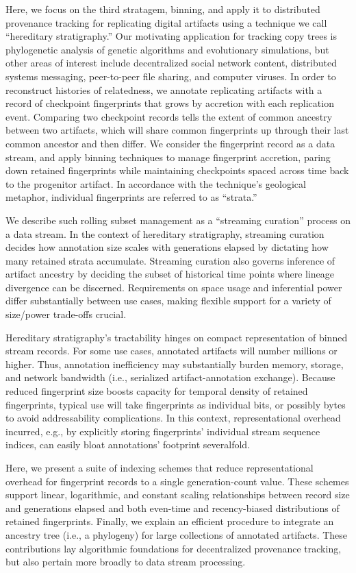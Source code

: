 Here, we focus on the third stratagem, binning, and apply it to distributed provenance tracking for replicating digital artifacts using a technique we call ``hereditary stratigraphy.''
Our motivating application for tracking copy trees is phylogenetic analysis of genetic algorithms and evolutionary simulations, but other areas of interest include decentralized social network content, distributed systems messaging, peer-to-peer file sharing, and computer viruses.
In order to reconstruct histories of relatedness, we annotate replicating artifacts with a record of checkpoint fingerprints that grows by accretion with each replication event.
Comparing two checkpoint records tells the extent of common ancestry between two artifacts, which will share common fingerprints up through their last common ancestor and then differ.
We consider the fingerprint record as a data stream, and apply binning techniques to manage fingerprint accretion, paring down retained fingerprints while maintaining checkpoints spaced across time back to the progenitor artifact.
In accordance with the technique's geological metaphor, individual fingerprints are referred to as ``strata.''

We describe such rolling subset management as a ``streaming curation'' process on a data stream.
In the context of hereditary stratigraphy, streaming curation decides how annotation size scales with generations elapsed by dictating how many retained strata accumulate.
Streaming curation also governs inference of artifact ancestry by deciding the subset of historical time points where lineage divergence can be discerned.
Requirements on space usage and inferential power differ substantially between use cases, making flexible support for a variety of size/power trade-offs crucial.

Hereditary stratigraphy's tractability hinges on compact representation of binned stream records.
For some use cases, annotated artifacts will number millions or higher.
Thus, annotation inefficiency may substantially burden memory, storage, and network bandwidth (i.e., serialized artifact-annotation exchange).
Because reduced fingerprint size boosts capacity for temporal density of retained fingerprints, typical use will take fingerprints as individual bits, or possibly bytes to avoid addressability complications.
In this context, representational overhead incurred, e.g., by explicitly storing fingerprints' individual stream sequence indices, can easily bloat annotations' footprint severalfold.

Here, we present a suite of indexing schemes that reduce representational overhead for fingerprint records to a single generation-count value.
These schemes support linear, logarithmic, and constant scaling relationships between record size and generations elapsed and both even-time and recency-biased distributions of retained fingerprints.
Finally, we explain an efficient procedure to integrate an ancestry tree (i.e., a phylogeny) for large collections of annotated artifacts.
These contributions lay algorithmic foundations for decentralized provenance tracking, but also pertain more broadly to data stream processing.


